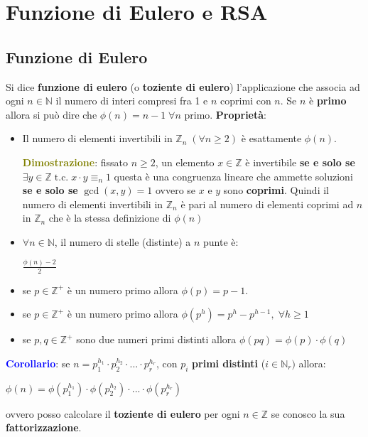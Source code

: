 \chapter{Funzione di Eulero e RSA}

\section{Funzione di Eulero}

Si dice \textbf{funzione di eulero} (o \textbf{toziente di eulero}) l'applicazione  che associa ad ogni $n \in \mathbb{N}$ il numero di interi compresi fra 1 e $n$ coprimi con $n$. Se $n$ è \textbf{primo} allora si può dire che $\phi(n) = n - 1 \; \forall n$ primo. \newline
\textbf{Proprietà}:
\begin{itemize}[nosep]
    \item Il numero di elementi invertibili in $\mathbb{Z}_n \; (\forall n \geq 2)$ è esattamente $\phi(n)$.
    \begin{boxA}
        \textcolor{olive}{\textbf{Dimostrazione}}: fissato $n \geq 2$, un elemento $x \in \mathbb{Z}$ è invertibile \textbf{se e solo se} $\exists y \in \mathbb{Z} \; \text{t.c.} \; x \cdot y \equiv_n 1$ questa è una congruenza lineare che ammette soluzioni \textbf{se e solo se} $\gcd (x, y) = 1$ ovvero se $x$ e $y$ sono \textbf{coprimi}. Quindi il numero di elementi invertibili in $\mathbb{Z}_n$ è pari al numero di elementi coprimi ad $n$ in $\mathbb{Z}_n$ che è la stessa definizione di $\phi(n)$
    \end{boxA}
    \item $\forall n \in \mathbb{N}$, il numero di stelle (distinte) a $n$ punte è:

    {\centering
        $\frac{\phi(n) - 2}{2}$
    \par}

    \item se $p \in \mathbb{Z}^+$ è un numero primo allora $\phi(p) = p - 1$.
    \item se $p \in \mathbb{Z}^+$ è un numero primo allora $\phi(p^h) = p^h - p^{h - 1}, \; \forall h \geq 1$
    \item se $p, q \in \mathbb{Z}^+$ sono due numeri primi distinti allora $\phi(pq) = \phi(p) \cdot \phi(q)$
\end{itemize}
\begin{flushleft}
    \textcolor{blue}{\textbf{Corollario}}: se $n = p_1^{h_1} \cdot p_2^{h_2} \cdot ... \cdot p_r^{h_r}$, con $p_i$ \textbf{primi distinti} ($i \in \mathbb{N}_r)$ allora:

    {\centering
        $\phi(n) = \phi(p_1^{h_1}) \cdot \phi(p_2^{h_2}) \cdot ... \cdot \phi(p_r^{h_r})$
    \par}
    ovvero posso calcolare il \textbf{toziente di eulero} per ogni $n \in \mathbb{Z}$ se conosco la sua \textbf{fattorizzazione}.
\end{flushleft}

